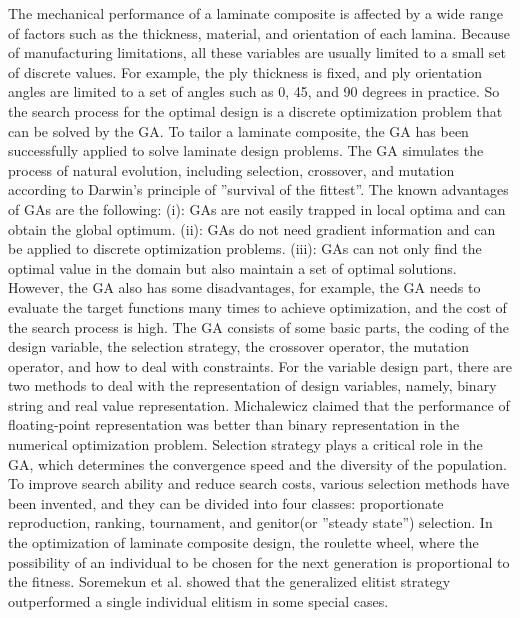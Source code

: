 \documentclass[10pt, journal]{IEEEtran}
\begin{document}
The mechanical performance of a laminate composite is affected by a wide range of factors such as the
thickness, material, and orientation of each lamina. Because of manufacturing limitations, all these
variables are usually limited to a small set of discrete values. For example, the ply thickness is fixed,
and ply orientation angles are limited to a set of angles such as 0, 45, and 90 degrees in practice. So
the search process for the optimal design is a discrete optimization problem that can be solved by the
GA. To tailor a laminate composite, the GA has been successfully applied to solve laminate design
problems\cite{riche1993optimization,nagendra1996improved,sadagopan1998application,todoroki1998stacking,liu2000permutation,sivakumar1998optimum,walker2003technique,lin2004stacking,kang2005minimum,murugan2007target,akbulut2008optimum}.
The GA simulates the process of natural evolution, including selection, crossover, and mutation
according to Darwin's principle of ''survival of the fittest''. The known advantages of GAs are the
following: (i): GAs are not easily trapped in local optima and can obtain the global
optimum. (ii): GAs do not need gradient information and can be applied to discrete optimization
problems. (iii): GAs can not only find the optimal value in the domain but also maintain a
set of optimal solutions. However, the GA also has some disadvantages, for example, the GA
needs to evaluate the target functions many times to achieve optimization, and the cost of the
search process is high. The GA consists of some basic parts, the coding of the design variable,
the selection strategy, the crossover operator, the mutation operator, and how to deal with constraints. For the
variable design part, there are two methods to deal with the representation of design variables, namely,
binary string and real value
representation\cite{riche1993optimization,todoroki1998stacking,houck1995genetic,vose1999simple}.
Michalewicz\cite{zbigniew1996genetic} claimed that the performance of floating-point representation was
better than binary representation in the numerical optimization problem. Selection strategy plays a
critical role in the GA, which determines the convergence speed and the diversity of the population. To
improve search ability and reduce search costs, various selection methods have been invented, and they
can be divided into four classes: proportionate reproduction, ranking, tournament, and
genitor(or ''steady state'') selection. In the optimization of laminate composite design, the roulette
wheel\cite{riche1993optimization,seresta2007optimal}, where the possibility of an individual to be
chosen for the next generation is proportional to the fitness.
Soremekun et al.\cite{soremekun2001composite} showed that the generalized elitist strategy outperformed a
single individual elitism in some special cases.
\end{document}
